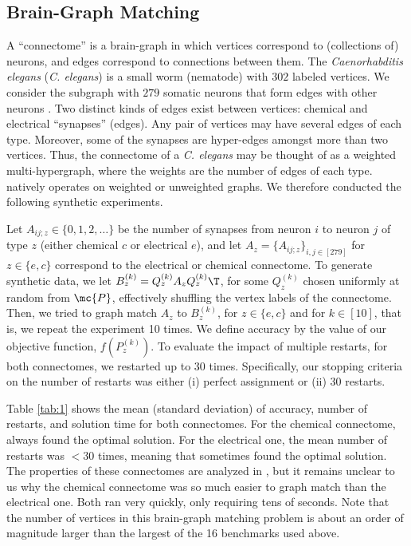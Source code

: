\documentclass[10pt,journal,cspaper,compsoc]{IEEEtran}
\begin{document}
\subsection{Brain-Graph Matching} %
\label{sub:connectome_classification}

A ``connectome'' is a brain-graph in which vertices correspond to (collections of) neurons, and edges correspond to connections between them. The \emph{Caenorhabditis elegans} (\emph{C. elegans}) is a small worm (nematode) with $302$ labeled vertices.  We consider the subgraph with $279$ somatic neurons that form edges with other neurons \cite{WhiteBrenner86, Varshney2011}.  Two distinct kinds of edges exist between vertices: chemical and electrical ``synapses'' (edges). Any pair of vertices may have several edges of each type. Moreover, some of the synapses are hyper-edges amongst more than two vertices.   Thus, the connectome of a \emph{C. elegans} may be thought of as a weighted multi-hypergraph, where the weights are the number of edges of each type.  \faqap natively operates on weighted or unweighted graphs.  We therefore conducted the following synthetic experiments.  

Let $A_{ij;z} \in \{0,1,2,\ldots\}$ be the number of synapses from neuron $i$ to neuron $j$ of type $z$ (either chemical $c$ or electrical $e$), and let $A_z=\{A_{ij;z}\}_{i,j \in [279]}$ for $z \in \{e,c\}$ correspond to the electrical or chemical connectome.  To generate synthetic data, we let $B_z^{(k)}=Q_z^{(k)} A_z {Q_z^{(k)}}\T$, for some $Q_z^{(k)}$ chosen uniformly at random from $\mc{P}$, effectively shuffling the vertex labels of the connectome.  Then, we tried to graph match $A_z$ to $B_z^{(k)}$, for $z \in \{e,c\}$ and for $k \in [10]$, that is, we repeat the experiment 10 times.  We define accuracy by the value of our objective function, $f(P_z^{(k)})$.  To evaluate the impact of multiple restarts, for both connectomes, we restarted \faqap up to 30 times.   Specifically, our stopping criteria on the number of restarts was either (i) perfect assignment or (ii) 30 restarts.

Table \ref{tab:1} shows the mean (standard deviation) of accuracy, number of restarts, and solution time for both connectomes.  For the chemical connectome, \faqap always found the optimal solution.  For the electrical one, the mean number of restarts was  $<30$ times, meaning that \faqap sometimes found the optimal solution. The properties of these connectomes are analyzed in \cite{Varshney2011}, but it remains unclear to us why the chemical connectome was so much easier to graph match than the electrical one. Both ran very quickly, only requiring tens of seconds.  Note that the number of vertices in this brain-graph matching problem is about an order of magnitude larger than the largest of the 16 benchmarks used above. 
\end{document}
